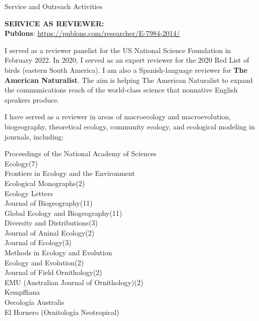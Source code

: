 \documentclass{resume} %
\begin{document}

\begin{rSection}{Service and Outreach Activities}

\textbf{SERVICE AS REVIEWER:} \smallskip \\ 
\textbf{Publons}: \url{https://publons.com/researcher/E-7984-2014/}

I served as a reviewer panelist for the US National Science Foundation in February 2022. In 2020, I served as an expert reviewer for the 2020 Red List of birds (eastern South America). I am also a Spanish-language reviewer for {\bf The American Naturalist}. The aim is helping The American Naturalist to expand the communications reach of the world-class science that nonnative English speakers produce.

I have served as a reviewer in areas of macroecology and macroevolution, biogeography, theoretical ecology, community ecology, and ecological modeling in journals, including: \smallskip

\begin{multicols}{2}

Proceedings of the National Academy of Sciences \\
Ecology(7) \\
Frontiers in Ecology and the Environment \\
Ecological Monographs(2) \\
Ecology Letters \\
Journal of Biogeography(11) \\ 
Global Ecology and Biogeography(11) \\
Diversity and Distributions(3) \\ 
Journal of Aninal Ecology(2) \\
Journal of Ecology(3) \\ 
Methods in Ecology and Evolution \\ 
Ecology and Evolution(2) \\ 
Journal of Field Ornithology(2) \\
EMU (Australian Journal of Ornithology)(2) \\ 
Kempffiana \\ 
Oecología Australis \\
El Hornero (Ornitología Neotropical) \smallskip

\columnbreak


\end{multicols}
\end{rSection}
\end{document}
